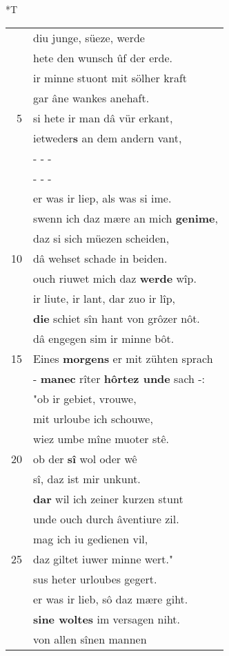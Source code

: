 \documentclass[8pt,a4paper,notitlepage]{article}
\begin{document}
\begin{table}[ht]
\begin{minipage}[t]{0.5\linewidth}
\small
\begin{center}*T
\end{center}
\begin{tabular}{rl}
 & diu junge, süeze, werde\\ 
 & hete den wunsch ûf der erde.\\ 
 & ir minne stuont mit sölher kraft\\ 
 & gar âne wankes anehaft.\\ 
5 & si hete ir man dâ vür erkant,\\ 
 & ietweder\textbf{s} an dem andern vant,\\ 
 & \multicolumn{1}{l}{ - - - }\\ 
 & \multicolumn{1}{l}{ - - - }\\ 
 & er was ir liep, als was si ime.\\ 
 & swenn ich daz mære an mich \textbf{genime},\\ 
 & daz si sich müezen scheiden,\\ 
10 & dâ wehset schade in beiden.\\ 
 & ouch riuwet mich daz \textbf{werde} wîp.\\ 
 & ir liute, ir lant, dar zuo ir lîp,\\ 
 & \textbf{die} schiet sîn hant von grôzer nôt.\\ 
 & dâ engegen sim ir minne bôt.\\ 
15 & Eines \textbf{morgens} er mit zühten sprach\\ 
 & - \textbf{manec} rîter \textbf{hôrtez unde} sach -:\\ 
 & "ob ir gebiet, vrouwe,\\ 
 & mit urloube ich schouwe,\\ 
 & wiez umbe mîne muoter stê.\\ 
20 & ob der \textbf{sî} wol oder wê\\ 
 & sî, daz ist mir unkunt.\\ 
 & \textbf{dar} wil ich zeiner kurzen stunt\\ 
 & unde ouch durch âventiure zil.\\ 
 & mag ich iu gedienen vil,\\ 
25 & daz giltet iuwer minne wert."\\ 
 & sus heter urloubes gegert.\\ 
 & er was ir lieb, sô daz mære giht.\\ 
 & \textbf{sine woltes} im versagen niht.\\ 
 & von allen sînen mannen\\ 

\end{tabular}
\end{minipage}
\end{table}
\end{document}

